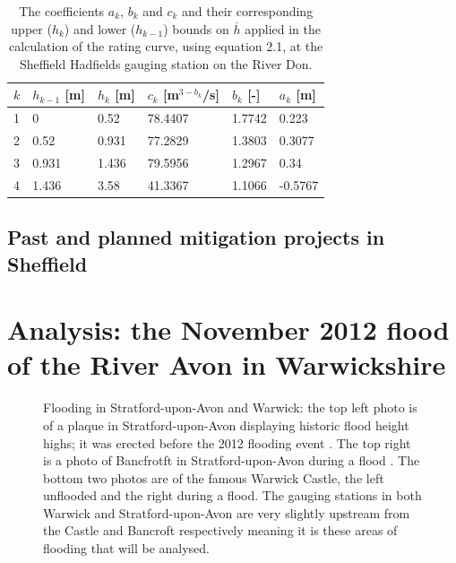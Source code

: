 \documentclass[11pt,a4paper]{article}
\begin{document}
\begin{table}[H]
\centering
\begin{tabular}{l|l|l|l|l|l}
$k$ & $h_{k-1}$ [m] & $h_k$ [m] & $c_k$ [m$^{3-b_k}$/s] & $b_k$ [-] & $a_k$ [m]\\
\hline
1 & 0 & 0.52 & 78.4407 & 1.7742 & 0.223 \\
2 & 0.52 & 0.931 & 77.2829 & 1.3803 & 0.3077 \\
3 & 0.931 & 1.436 & 79.5956 & 1.2967 & 0.34 \\
4 & 1.436 & 3.58 & 41.3367 & 1.1066 & -0.5767 \\
\end{tabular}
\caption{The coefficients $a_k$, $b_k$ and $c_k$ and their corresponding upper ($h_k$) and lower ($h_{k-1}$) bounds on $\overline{h}$ \cite{Calder-Don} applied in the calculation of the rating curve, using equation 2.1, at the Sheffield Hadfields gauging station on the River Don.}
\end{table}

\subsection{Past and planned mitigation projects in Sheffield}

\newpage
\section{Analysis: the November 2012 flood of the River Avon in Warwickshire}
\begin{figure}[H]
\centering
{}
\hfill
{}
\caption{Flooding in Stratford-upon-Avon and Warwick: the top left photo is of a plaque in Stratford-upon-Avon displaying historic flood height highs{;} it was erected before the 2012 flooding event \cite{plaque}. The top right is a photo of Bancfrotft in Stratford-upon-Avon during a flood \cite{strat-flood}. The bottom two photos are of the famous Warwick Castle, the left \cite{castle} unflooded and the right \cite{warwick-flooding} during a flood. The gauging stations in both Warwick and Stratford-upon-Avon are very slightly upstream from the Castle and Bancroft respectively meaning it is these areas of flooding that will be analysed.}
\end{figure}
\end{document}
